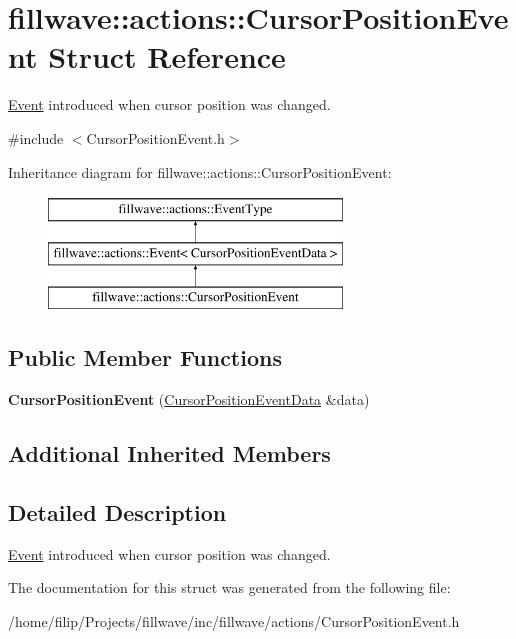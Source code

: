 \hypertarget{classfillwave_1_1actions_1_1CursorPositionEvent}{}\section{fillwave\+:\+:actions\+:\+:Cursor\+Position\+Event Struct Reference}
\label{classfillwave_1_1actions_1_1CursorPositionEvent}


\hyperlink{classfillwave_1_1actions_1_1Event}{Event} introduced when cursor position was changed.  




{\ttfamily \#include $<$Cursor\+Position\+Event.\+h$>$}

Inheritance diagram for fillwave\+:\+:actions\+:\+:Cursor\+Position\+Event\+:\begin{figure}[H]
\begin{center}
\leavevmode
\includegraphics[height=3.000000cm]{classfillwave_1_1actions_1_1CursorPositionEvent}
\end{center}
\end{figure}
\subsection*{Public Member Functions}
\begin{DoxyCompactItemize}
\item 
\hypertarget{classfillwave_1_1actions_1_1CursorPositionEvent_a9bad24f2271b3c9e0943c472c98a5002}{}{\bfseries Cursor\+Position\+Event} (\hyperlink{structfillwave_1_1actions_1_1CursorPositionEventData}{Cursor\+Position\+Event\+Data} \&data)\label{classfillwave_1_1actions_1_1CursorPositionEvent_a9bad24f2271b3c9e0943c472c98a5002}

\end{DoxyCompactItemize}
\subsection*{Additional Inherited Members}


\subsection{Detailed Description}
\hyperlink{classfillwave_1_1actions_1_1Event}{Event} introduced when cursor position was changed. 

The documentation for this struct was generated from the following file\+:\begin{DoxyCompactItemize}
\item 
/home/filip/\+Projects/fillwave/inc/fillwave/actions/Cursor\+Position\+Event.\+h\end{DoxyCompactItemize}

